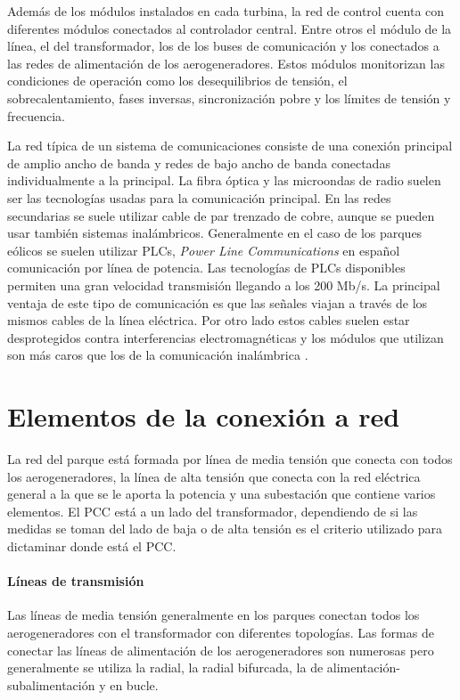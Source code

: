 \documentclass{book}
\begin{document}
		Adem\'as de los m\'odulos instalados en cada turbina, la red de control cuenta con diferentes m\'odulos conectados al controlador central. Entre otros el m\'odulo de la l\'inea, el del transformador, los de los buses de comunicaci\'on y los conectados a las redes de alimentaci\'on de los aerogeneradores. Estos m\'odulos monitorizan las condiciones de operaci\'on como los desequilibrios de tensi\'on, el sobrecalentamiento, fases inversas, sincronizaci\'on pobre y los l\'imites de tensi\'on y frecuencia\cite{ComunicationControl}.   \par
		La red t\'ipica de un sistema de comunicaciones consiste de una conexi\'on principal de amplio ancho de banda y redes de bajo ancho de banda conectadas individualmente a la principal. La fibra \'optica y las microondas de radio suelen ser las tecnolog\'ias usadas para la comunicaci\'on principal. En las redes secundarias se suele utilizar cable de par trenzado de cobre, aunque se pueden usar tambi\'en sistemas inal\'ambricos. Generalmente en el caso de los parques e\'olicos se suelen utilizar PLCs, \emph{Power Line Communications} en español comunicaci\'on por l\'inea de potencia. Las tecnolog\'ias de PLCs disponibles permiten una gran velocidad transmisi\'on llegando a los 200 Mb/s. La principal ventaja de este tipo de comunicaci\'on es que las señales viajan a trav\'es de los mismos cables de la l\'inea el\'ectrica. Por otro lado estos cables suelen estar desprotegidos contra interferencias electromagn\'eticas y los m\'odulos que utilizan son m\'as caros que los de la comunicaci\'on inal\'ambrica \cite{ComunicationWF}. \par
	
	\section{Elementos de la conexi\'on a red}
	
	La red del parque est\'a formada por l\'inea de media tensi\'on que conecta con todos los aerogeneradores, la l\'inea de alta tensi\'on que conecta con la red el\'ectrica general a la que se le aporta la potencia y una subestaci\'on que contiene varios elementos. El PCC est\'a a un lado del transformador, dependiendo de si las medidas se toman del lado de baja o de alta tensi\'on es el criterio utilizado para dictaminar donde est\'a el PCC. \par
		\paragraph {L\'ineas de transmisi\'on}
Las l\'ineas de media tensi\'on generalmente en los parques conectan todos los aerogeneradores con el transformador con diferentes topolog\'ias. Las formas de conectar las l\'ineas de alimentaci\'on de los aerogeneradores son numerosas pero generalmente se utiliza la radial, la radial bifurcada, la de alimentaci\'on-subalimentaci\'on y en bucle. \par
\end{document}
